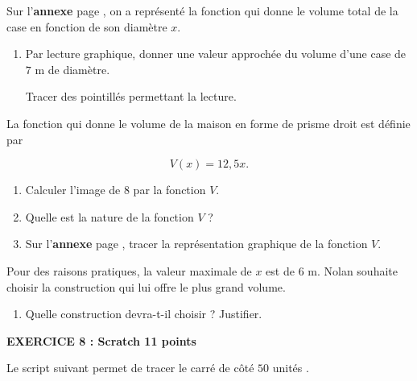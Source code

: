 \documentclass[10pt]{article}
\begin{document}
\medskip

Sur l'\textbf{annexe } page \pageref{annexe1}, on a représenté la fonction qui donne le volume total de la case en fonction de son diamètre $x$.

\medskip

\begin{enumerate}
\item Par lecture graphique, donner une valeur approchée du volume d'une case de $7$ m de diamètre.

Tracer des pointillés permettant la lecture.
\end{enumerate}

La fonction qui donne le volume de la maison en forme de prisme droit est définie par 

\[V(x) = 12,5 x.\]

\begin{enumerate}[resume]
\item Calculer l'image de 8 par la fonction $V$.
\item Quelle est la nature de la fonction $V$ ?
\item Sur l'\textbf{annexe } page \pageref{annexe1}, tracer la représentation graphique de la fonction $V$.
\end{enumerate}

Pour des raisons pratiques, la valeur maximale de $x$ est de $6$ m. Nolan souhaite choisir la construction qui lui offre le plus grand volume.
\begin{enumerate}[resume]
\item Quelle construction devra-t-il choisir ? Justifier. 
\end{enumerate}

\vspace{0,5cm}

\textbf{EXERCICE 8 : Scratch \hfill 11 points}

\medskip


Le script suivant permet de tracer le carré de côté $50$ unités .


\begin{center}
\begin{scratch}
{
}
\end{scratch}
\end{center}
\end{document}
